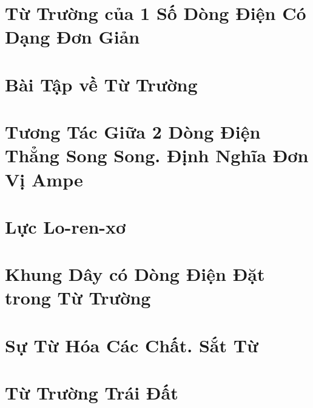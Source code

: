 \documentclass[oneside]{book}
\numberwithin{equation}{section}
\begin{document}

\section{Từ Trường của 1 Số Dòng Điện Có Dạng Đơn Giản}


\section{Bài Tập về Từ Trường}


\section{Tương Tác Giữa 2 Dòng Điện Thẳng Song Song. Định Nghĩa Đơn Vị Ampe}


\section{Lực Lo-ren-xơ}


\section{Khung Dây có Dòng Điện Đặt trong Từ Trường}


\section{Sự Từ Hóa Các Chất. Sắt Từ}


\section{Từ Trường Trái Đất}

\end{document}
